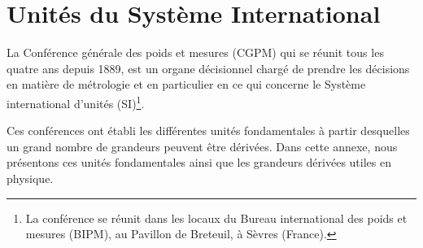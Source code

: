 \chapter{Unités du Système International\label{annexe-usi}}
La Conférence générale des poids et mesures (CGPM) qui se réunit tous les 
quatre ans depuis 1889, est un organe décisionnel chargé de prendre les 
décisions en matière de métrologie et en particulier en ce qui concerne le 
Système international d'unités (SI)\footnote{La conférence se réunit dans les 
locaux du Bureau international des poids et mesures (BIPM), au Pavillon de 
Breteuil, à Sèvres (France).}.

Ces conférences ont établi les différentes unités fondamentales à partir 
desquelles un grand nombre de grandeurs peuvent être dérivées. Dans cette 
annexe, nous présentons ces unités fondamentales ainsi que les grandeurs 
dérivées utiles en physique.

